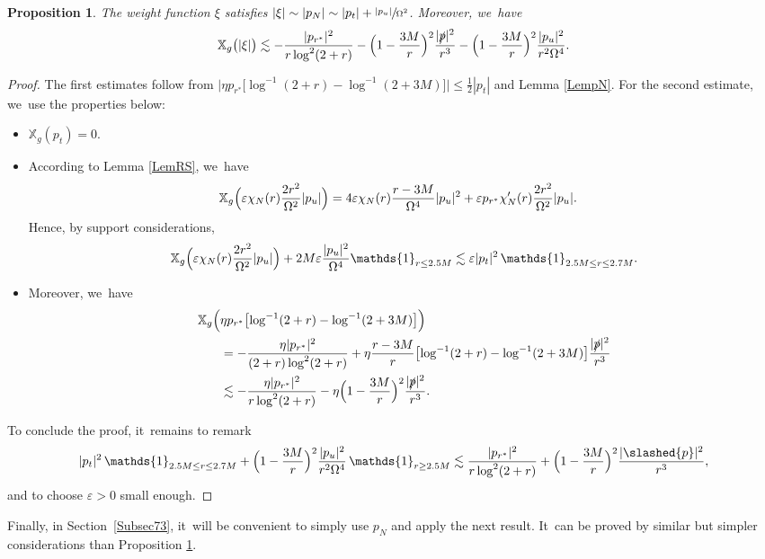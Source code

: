 \documentclass[JEP,XML,SOM,Unicode,published]{cedram}
\let\epsilon\varepsilon
\theoremstyle{plain}
\newtheorem{proposition}{Proposition}[section]
\theoremstyle{definition}
\newcommand\T{{\mathbb{X}}}
\begin{document}
\begin{proposition}\label{Promultiplierm}
The weight function $\xi$ satisfies $|\xi| \sim |p_N| \sim |p_t|+\sfrac{|p_u|}{\Omega^2}$. Moreover, we~have
\[
\T_g \bigl(|\xi| \bigr) \lesssim -\frac{|p_{r^*}|^2}{r \log^2(2+r)}-\Bigl(1-\frac{3M}{r} \Bigr)^2 \frac{|\slashed{p}|^2}{r^3} -\Bigl(1-\frac{3M}{r} \Bigr)^2\frac{|p_u|^2}{r^2\Omega^4}.
\]
\end{proposition}
\begin{proof}
The first estimates follow from $\big|\eta p_{r^*} \bigl[ \log^{-1}(2+r) -\log^{-1}(2+3M) \bigr]\big| \leq \frac{1}{2}|p_t|$ and Lemma \ref{LempN}. For the second estimate, we~use the properties below:
\begin{itemize}
\item $\T_g(p_t)=0$.
\item According to Lemma \ref{LemRS}, we~have
\begin{align*}
\T_g \Bigl(\epsilon \chi_N (r) \frac{2r^2}{\Omega^2} |p_u| \Bigr) & = 4\epsilon \chi_N(r)\frac{r-3M}{\Omega^4}|p_u|^2 +\epsilon p_{r^*} \chi'_N(r) \frac{2r^2}{\Omega^2} |p_u|.
\end{align*}
Hence, by support considerations,
\[
\T_g \Bigl(\epsilon \chi_N (r) \frac{2r^2}{\Omega^2} |p_u| \Bigr) + 2M \epsilon \frac{|p_u|^2}{\Omega^4} \mathds{1}_{r \leq 2.5M} \lesssim \epsilon |p_t|^2 \, \mathds{1}_{2.5M \leq r \leq 2.7M}.
\]
\item Moreover, we~have
\begin{align*}
\nonumber \T_g \Bigl(&\eta p_{r^*} \bigl[ \log^{-1}(2+r) -\log^{-1}(2+3M) \bigr] \Bigr)\\
& =-\frac{ \eta |p_{r^*}|^2}{(2+r) \log^2(2+r)}+\eta \frac{r-3M}{r}\bigl[ \log^{-1}(2+r) -\log^{-1}(2+3M) \bigr] \frac{|\slashed{p}|^2}{r^3} \nonumber\\
& \lesssim -\frac{ \eta |p_{r^*}|^2}{r \log^2(2+r)}- \eta \Bigl(1-\frac{3M}{r} \Bigr)^2 \frac{|\slashed{p}|^2}{r^3}.%
\end{align*}
\end{itemize}
To conclude the proof, it~remains to remark
\[
|p_t|^2 \, \mathds{1}_{2.5M \leq r \leq 2.7M} + \Bigl(1-\frac{3M}{r} \Bigr)^2 \frac{|p_u|^2}{r^2\Omega^4} \, \mathds{1}_{r \geq 2.5M} \lesssim \frac{ |p_{r^*}|^2}{r \log^2(2+r)}+ \Bigl(1-\frac{3M}{r} \Bigr)^2 \frac{|\slashed{p}|^2}{r^3},
\]
and to choose $\epsilon>0 $ small enough.
\end{proof}

Finally, in Section~\ref{Subsec73}, it~will be convenient to simply use $p_N$ and apply the next result. It~can be proved by similar but simpler considerations than Proposition \ref{Promultiplierm}.
\end{document}
